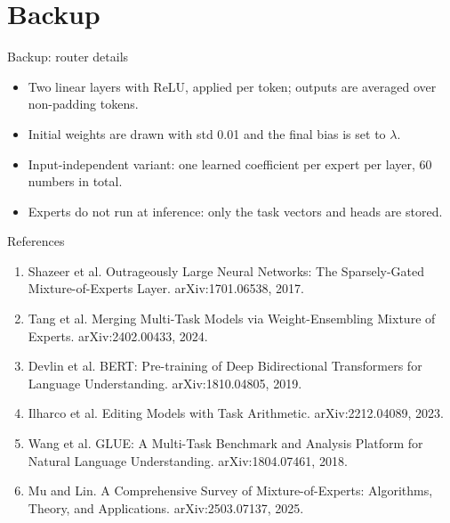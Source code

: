 \section{Backup}

\begin{frame}{Backup: router details}
  \begin{itemize}
    \item Two linear layers with ReLU, applied per token; outputs are averaged over non-padding tokens.
    \item Initial weights are drawn with std 0.01 and the final bias is set to $\lambda$.
    \item Input-independent variant: one learned coefficient per expert per layer, 60 numbers in total.
    \item Experts do not run at inference: only the task vectors and heads are stored.
  \end{itemize}
\end{frame}

\begin{frame}{References}
  \footnotesize
  \begin{enumerate}
    \item[{[1]}] Shazeer et al. Outrageously Large Neural Networks: The Sparsely-Gated Mixture-of-Experts Layer. arXiv:1701.06538, 2017.
    \item[{[2]}] Tang et al. Merging Multi-Task Models via Weight-Ensembling Mixture of Experts. arXiv:2402.00433, 2024.
    \item[{[3]}] Devlin et al. BERT: Pre-training of Deep Bidirectional Transformers for Language Understanding. arXiv:1810.04805, 2019.
    \item[{[4]}] Ilharco et al. Editing Models with Task Arithmetic. arXiv:2212.04089, 2023.
    \item[{[5]}] Wang et al. GLUE: A Multi-Task Benchmark and Analysis Platform for Natural Language Understanding. arXiv:1804.07461, 2018.
    \item[{[6]}] Mu and Lin. A Comprehensive Survey of Mixture-of-Experts: Algorithms, Theory, and Applications. arXiv:2503.07137, 2025.
  \end{enumerate}
\end{frame}
